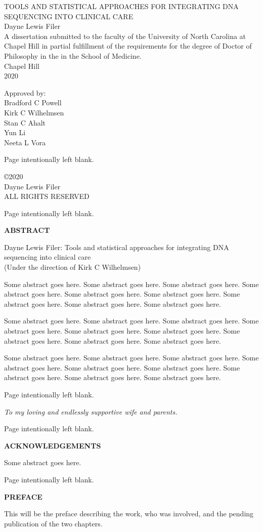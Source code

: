 \documentclass[11pt,letterpaper]{book}
\makeatletter
\renewcommand{\maketitle}{ 
	\singlespacing
	\thispagestyle{empty} 
	\begin{center}
	  \vspace*{0.8125in}
	  \Large{{\MakeUppercase{Tools and statistical approaches for integrating DNA sequencing into clinical care}}} \\ \vspace{1in} 
	  \normalsize 
  	Dayne Lewis Filer \\ \vspace{1in} 
  	A dissertation submitted to the faculty of the University of North Carolina at Chapel Hill in partial fulfillment of the requirements for the degree of Doctor of Philosophy in the  in the School of Medicine.
  	\vspace{1in}
  	\\ Chapel Hill \\ 2020 \\ 
	\end{center}
	\vspace{1in}
	\hfill
  \begin{minipage}{1.5in} 
      \raggedright
      \doublespacing
      Approved by:\\
              Bradford C Powell \\
              Kirk C Wilhelmsen \\
              Stan C Ahalt \\
              Yun Li \\
              Neeta L Vora \\
        \end{minipage}
}
\newcommand*{\blankpage}{%
\vspace*{\fill}
{\centering Page intentionally left blank. \par}
\vspace{\fill}}
\renewcommand*{\cleardoublepage}{\clearpage\if@twoside \ifodd\c@page\else
\blankpage
\thispagestyle{empty}
\newpage
\if@twocolumn\hbox{}\newpage\fi\fi\fi}
\newcommand{\mytwoin}[1]{
\vspace*{0.6875in}
\begin{center}
\bfseries\Large\MakeUppercase{#1}
\end{center}
}
\makeatother
\begin{document}
\frontmatter

  \maketitle

\pagestyle{plain}
\doublespacing

  \cleardoublepage
  \thispagestyle{empty}
  \vspace*{\fill}
  \begin{center}
    \singlespacing
    \copyright 2020 \\
    Dayne Lewis Filer \\
    ALL RIGHTS RESERVED
  \end{center}

  \cleardoublepage
  \mytwoin{abstract}
  \begin{center}
    \singlespacing
    Dayne Lewis Filer: Tools and statistical approaches for integrating DNA sequencing into clinical care \\ (Under the direction of Kirk C Wilhelmsen)
  \end{center}
  
  \doublespacing
  Some abstract goes here. Some abstract goes here. Some abstract goes here. Some abstract goes here. Some abstract goes here. Some abstract goes here. Some abstract goes here. Some abstract goes here. Some abstract goes here.
  
  Some abstract goes here. Some abstract goes here. Some abstract goes here. Some abstract goes here. Some abstract goes here. Some abstract goes here. Some abstract goes here. Some abstract goes here. Some abstract goes here.
  
  Some abstract goes here. Some abstract goes here. Some abstract goes here. Some abstract goes here. Some abstract goes here. Some abstract goes here. Some abstract goes here. Some abstract goes here. Some abstract goes here.

  \cleardoublepage
  \vspace*{0.75in}
  \begin{center}
    \emph{To my loving and endlessly supportive wife and parents.}
  \end{center}

  \cleardoublepage
  \mytwoin{Acknowledgements}
  Some abstract goes here.

  \cleardoublepage
  \mytwoin{Preface}
  This will be the preface describing the work, who was involved, and the pending publication of the two chapters.
\end{document}
